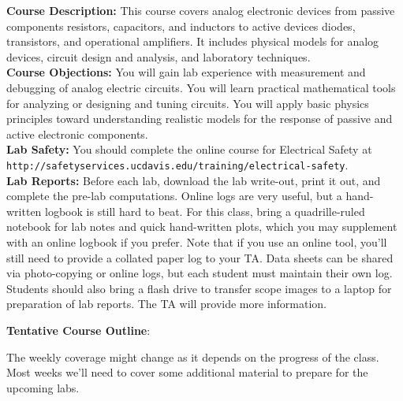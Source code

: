 \documentclass[12pt]{article}
\begin{document}
\noindent
\textbf {Course Description:}  This course covers analog electronic devices from passive components resistors, capacitors, and inductors to active devices diodes, transistors, and operational amplifiers.   It includes physical models for analog devices, circuit design and analysis, and laboratory techniques. \\

\noindent
\textbf {Course Objections:} 
You will gain  lab experience with measurement and debugging of analog electric circuits.  You will learn practical mathematical tools for analyzing or designing and tuning circuits.  You will apply basic physics principles toward understanding realistic models for the response of passive and active electronic components. \\

\noindent
\textbf {Lab Safety:} 
You should complete the online course for Electrical Safety at \\
{\tt http://safetyservices.ucdavis.edu/training/electrical-safety}.\\

\noindent
\textbf {Lab Reports:} 
Before each lab, download the lab write-out, print it out, and complete the pre-lab computations. Online logs are very useful, but a hand-written logbook is still hard to beat. For this class, bring a quadrille-ruled notebook for lab notes and quick hand-written plots, which you may supplement with an online logbook if you prefer. Note that if you use an online tool, you'll still need to provide a collated paper log to your TA. Data sheets can be shared via photo-copying or online logs, but each student must maintain their own log.  Students should also bring a flash drive to transfer scope images to a laptop for preparation of lab reports.
The TA will provide more information.


\vskip 0.5cm
\noindent
\textbf {Tentative Course Outline}:

The weekly coverage might change as it depends on the progress of the class.    Most weeks we'll need to cover some additional material to prepare for the upcoming labs.
\end{document}
